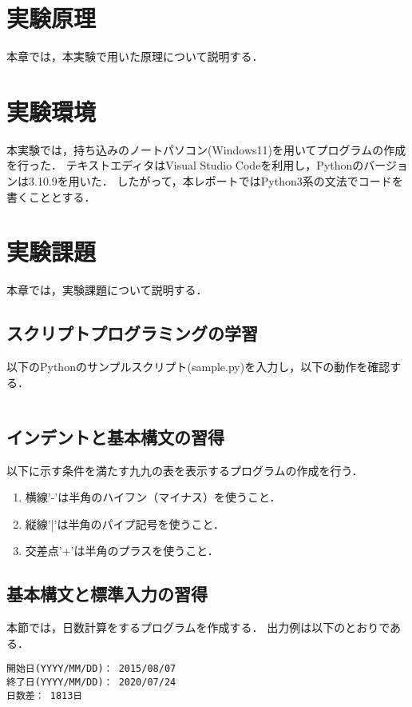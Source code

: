 \documentclass[uplatex,dvipdfmx,12pt]{jsarticle}
\begin{document}
\newpage
\section{実験原理}
本章では，本実験で用いた原理について説明する．

\newpage
\section{実験環境}
本実験では，持ち込みのノートパソコン(Windows11)を用いてプログラムの作成を行った．
テキストエディタはVisual Studio Codeを利用し，Pythonのバージョンは3.10.9を用いた．
したがって，本レポートではPython3系の文法でコードを書くこととする．

\newpage
\section{実験課題}\label{sec:kadai}
本章では，実験課題について説明する．
\subsection{スクリプトプログラミングの学習}
以下のPythonのサンプルスクリプト(sample.py)を入力し，以下の動作を確認する．

\begin{lstlisting}

\end{lstlisting}
\subsection{インデントと基本構文の習得}
以下に示す条件を満たす九九の表を表示するプログラムの作成を行う．
\begin{enumerate}
  \item 横線'-'は半角のハイフン（マイナス）を使うこと．
  \item 縦線'|'は半角のパイプ記号を使うこと．
  \item 交差点'+'は半角のプラスを使うこと．
\end{enumerate}



\subsection{基本構文と標準入力の習得}
本節では，日数計算をするプログラムを作成する．
出力例は以下のとおりである．

\begin{lstlisting}[caption={日数計算プログラムの出力例},label=dayPro]
開始日(YYYY/MM/DD)： 2015/08/07
終了日(YYYY/MM/DD)： 2020/07/24
日数差： 1813日
\end{lstlisting}
\end{document}
